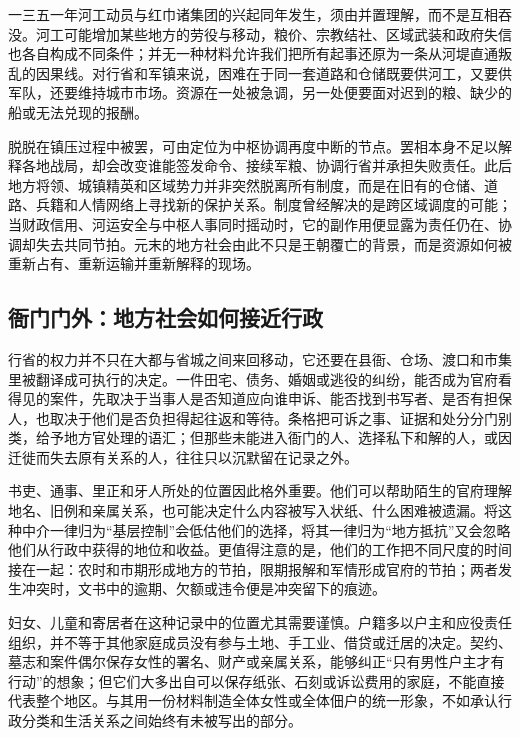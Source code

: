 一三五一年河工动员与红巾诸集团的兴起同年发生，须由并置理解，而不是互相吞没。河工可能增加某些地方的劳役与移动，粮价、宗教结社、区域武装和政府失信也各自构成不同条件；并无一种材料允许我们把所有起事还原为一条从河堤直通叛乱的因果线。对行省和军镇来说，困难在于同一套道路和仓储既要供河工，又要供军队，还要维持城市市场。资源在一处被急调，另一处便要面对迟到的粮、缺少的船或无法兑现的报酬。

脱脱在镇压过程中被罢，可由定位为中枢协调再度中断的节点。罢相本身不足以解释各地战局，却会改变谁能签发命令、接续军粮、协调行省并承担失败责任。此后地方将领、城镇精英和区域势力并非突然脱离所有制度，而是在旧有的仓储、道路、兵籍和人情网络上寻找新的保护关系。制度曾经解决的是跨区域调度的可能；当财政信用、河运安全与中枢人事同时摇动时，它的副作用便显露为责任仍在、协调却失去共同节拍。元末的地方社会由此不只是王朝覆亡的背景，而是资源如何被重新占有、重新运输并重新解释的现场。

\subsection{衙门门外：地方社会如何接近行政}

行省的权力并不只在大都与省城之间来回移动，它还要在县衙、仓场、渡口和市集里被翻译成可执行的决定。一件田宅、债务、婚姻或逃役的纠纷，能否成为官府看得见的案件，先取决于当事人是否知道应向谁申诉、能否找到书写者、是否有担保人，也取决于他们是否负担得起往返和等待。条格把可诉之事、证据和处分分门别类，给予地方官处理的语汇；但那些未能进入衙门的人、选择私下和解的人，或因迁徙而失去原有关系的人，往往只以沉默留在记录之外。

书吏、通事、里正和牙人所处的位置因此格外重要。他们可以帮助陌生的官府理解地名、旧例和亲属关系，也可能决定什么内容被写入状纸、什么困难被遗漏。将这种中介一律归为“基层控制”会低估他们的选择，将其一律归为“地方抵抗”又会忽略他们从行政中获得的地位和收益。更值得注意的是，他们的工作把不同尺度的时间接在一起：农时和市期形成地方的节拍，限期报解和军情形成官府的节拍；两者发生冲突时，文书中的逾期、欠额或违令便是冲突留下的痕迹。

妇女、儿童和寄居者在这种记录中的位置尤其需要谨慎。户籍多以户主和应役责任组织，并不等于其他家庭成员没有参与土地、手工业、借贷或迁居的决定。契约、墓志和案件偶尔保存女性的署名、财产或亲属关系，能够纠正“只有男性户主才有行动”的想象；但它们大多出自可以保存纸张、石刻或诉讼费用的家庭，不能直接代表整个地区。与其用一份材料制造全体女性或全体佃户的统一形象，不如承认行政分类和生活关系之间始终有未被写出的部分。

